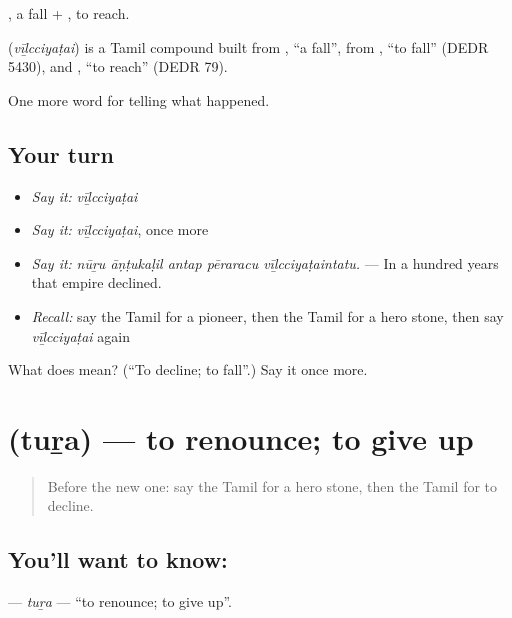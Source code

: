 , a fall + , to reach.

\begin{cousinweb}
\textbf{} (\emph{vīḻcciyaṭai}) is a Tamil compound built from , \textquotedblleft{}a fall\textquotedblright{}, from , \textquotedblleft{}to fall\textquotedblright{} (DEDR 5430), and , \textquotedblleft{}to reach\textquotedblright{} (DEDR 79).
\end{cousinweb}

\begin{grammarlens}[title={What you've built}]
One more word for telling what happened.
\end{grammarlens}

\subsection*{Your turn}
\begin{itemize}
\raggedright
  \item \emph{Say it:} \emph{vīḻcciyaṭai}
  \item \emph{Say it:} \emph{vīḻcciyaṭai}, once more
  \item \emph{Say it:} \emph{nūṟu āṇṭukaḷil antap pēraracu vīḻcciyaṭaintatu.} — In a hundred years that empire declined.
  \item \emph{Recall:} say the Tamil for a pioneer, then the Tamil for a hero stone, then say \emph{vīḻcciyaṭai} again
\end{itemize}

\begin{tcolorbox}[breakable,colback=teal!4,colframe=teal!35!black,title={Before you move on}]
What does  mean? (\textquotedblleft{}To decline; to fall\textquotedblright{}.) Say it once more.
\end{tcolorbox}
\section[\texorpdfstring{\ta{துற} (tuṟa)}{துற (tuṟa)}]{ (tuṟa) — to renounce; to give up}

\label{lesson:TA-C340-tura}



\begin{quote}
Before the new one: say the Tamil for a hero stone, then the Tamil for to decline.
\end{quote}

\subsection*{You'll want to know: }
\textbf{} — \emph{tuṟa} — \textquotedblleft{}to renounce; to give up\textquotedblright{}.

